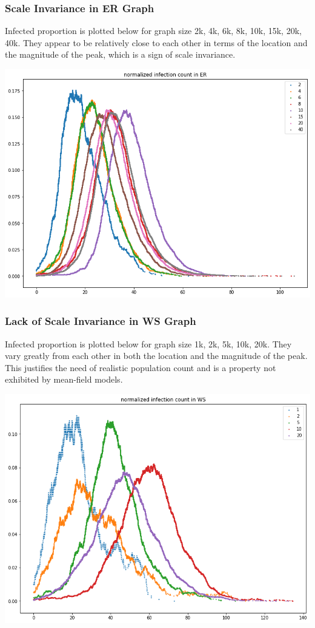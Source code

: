 \documentclass[12pt]{article}
\theoremstyle{definition}
\begin{document}
\subsubsection{Scale Invariance in ER Graph}
Infected proportion is plotted below for graph size 2k, 4k, 6k, 8k, 10k, 15k, 20k, 40k. They appear to be relatively close to each other in terms of the location and the magnitude of the peak, which is a sign of scale invariance.
\begin{center}
    \includegraphics[scale=0.4]{images/ER_normalized.png}
\end{center}

\subsubsection{Lack of Scale Invariance in WS Graph}
Infected proportion is plotted below for graph size 1k, 2k, 5k, 10k, 20k. They vary greatly from each other in both the location and the magnitude of the peak. This justifies the need of realistic population count and is a property not exhibited by mean-field models. 
\begin{center}
    \includegraphics[scale=0.4]{images/WS_normalized.png}
\end{center}
\end{document}
